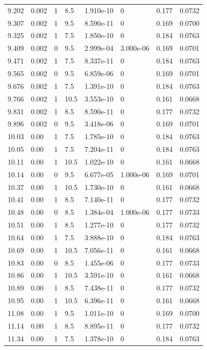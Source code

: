 \documentclass[preview]{standalone}
\begin{document}
{{{\begin{tabular}{L{1.2cm}C{1.2cm} C{0.3cm}C{0.5cm} C{1.4cm}C{1.4cm} C{1.4cm}C{1.4cm}}
  9.202  &  0.002  & 1     & 8.5 &  1.910e-10  & 0  & 0.177 &  0.0732   \\ 
  9.307  &  0.002  & 1     & 9.5 &  8.590e-11  & 0  & 0.169 &  0.0700   \\ 
  9.325  &  0.002  & 1     & 7.5 &  1.850e-10  & 0  & 0.184 &  0.0763   \\ 
  9.409  &  0.002  & 0     & 9.5 &  2.999e-04  & 3.000e-06  & 0.169 &  0.0701   \\ 
  9.471  &  0.002  & 1     & 7.5 &  8.337e-11  & 0  & 0.184 &  0.0763   \\ 
  9.565  &  0.002  & 0     & 9.5 &  6.859e-06  & 0  & 0.169 &  0.0701   \\ 
  9.676  &  0.002  & 1     & 7.5 &  1.391e-10  & 0  & 0.184 &  0.0763   \\ 
  9.766  &  0.002  & 1     & 10.5 &  3.553e-10  & 0  & 0.161 &  0.0668   \\ 
  9.831  &  0.002  & 1     & 8.5 &  8.590e-11  & 0  & 0.177 &  0.0732   \\ 
  9.896  &  0.002  & 0     & 9.5 &  3.418e-06  & 0  & 0.169 &  0.0701   \\ 
  10.03  &  0.00  & 1     & 7.5 &  1.785e-10  & 0  & 0.184 &  0.0763   \\ 
  10.05  &  0.00  & 1     & 7.5 &  7.204e-11  & 0  & 0.184 &  0.0763   \\ 
  10.11  &  0.00  & 1     & 10.5 &  1.022e-10  & 0  & 0.161 &  0.0668   \\ 
  10.14  &  0.00  & 0     & 9.5 &  6.677e-05  & 1.000e-06  & 0.169 &  0.0701   \\ 
  10.37  &  0.00  & 1     & 10.5 &  1.730e-10  & 0  & 0.161 &  0.0668   \\ 
  10.41  &  0.00  & 1     & 8.5 &  7.140e-11  & 0  & 0.177 &  0.0732   \\ 
  10.48  &  0.00  & 0     & 8.5 &  1.384e-04  & 1.000e-06  & 0.177 &  0.0733   \\ 
  10.51  &  0.00  & 1     & 8.5 &  1.277e-10  & 0  & 0.177 &  0.0732   \\ 
  10.64  &  0.00  & 1     & 7.5 &  3.888e-10  & 0  & 0.184 &  0.0763   \\ 
  10.69  &  0.00  & 1     & 10.5 &  7.056e-11  & 0  & 0.161 &  0.0668   \\ 
  10.83  &  0.00  & 0     & 8.5 &  1.455e-06  & 0  & 0.177 &  0.0733   \\ 
  10.86  &  0.00  & 1     & 10.5 &  3.591e-10  & 0  & 0.161 &  0.0668   \\ 
  10.89  &  0.00  & 1     & 8.5 &  7.438e-11  & 0  & 0.177 &  0.0732   \\ 
  10.95  &  0.00  & 1     & 10.5 &  6.396e-11  & 0  & 0.161 &  0.0668   \\ 
  11.08  &  0.00  & 1     & 9.5 &  1.011e-10  & 0  & 0.169 &  0.0700   \\ 
  11.14  &  0.00  & 1     & 8.5 &  8.895e-11  & 0  & 0.177 &  0.0732   \\ 
  11.34  &  0.00  & 1     & 7.5 &  1.378e-10  & 0  & 0.184 &  0.0763   \\ 
\hline 
\end{tabular} 

}}}
\end{document}
